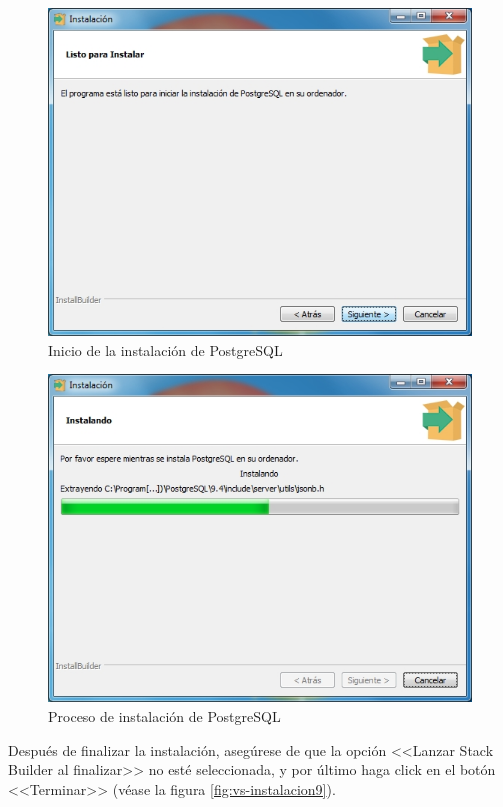 \begin{figure}[H]
  \centering
  \includegraphics[width=.7\linewidth]{./img/postgres7.jpg}
\caption[]{Inicio de la instalaci\'{o}n de PostgreSQL\label{fig:postgres7}}
\end{figure}

\begin{figure}[H]
  \centering
  \includegraphics[width=.7\linewidth]{./img/postgres8.jpg}
\caption[]{Proceso de instalaci\'{o}n de PostgreSQL\label{fig:postgres8}}
\end{figure}

\newpage

Despu\'{e}s de finalizar la instalaci\'{o}n, aseg\'{u}rese de que la opci\'{o}n <<Lanzar Stack Builder al finalizar>> no est\'{e} seleccionada, y por \'{u}ltimo haga click en el bot\'{o}n <<Terminar>> (v\'{e}ase la figura \ref{fig:vs-instalacion9}).	

